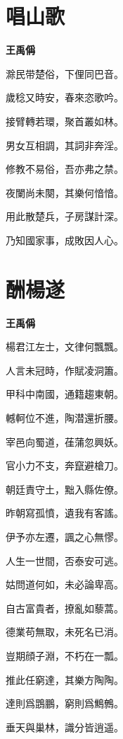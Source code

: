 \documentclass[12pt,a4paper]{ctexbook}
\begin{document}
\section{唱山歌}
\textbf{王禹偁}\par\vspace{0.5em}
滁民带楚俗，下俚同巴音。\par
歲稔又時安，春來恣歌吟。\par
接臂轉若環，聚首叢如林。\par
男女互相調，其詞非奔淫。\par
修教不易俗，吾亦弗之禁。\par
夜闌尚未闋，其樂何愔愔。\par
用此散楚兵，子房謀計深。\par
乃知國家事，成敗因人心。\par

\section{酬楊遂}
\textbf{王禹偁}\par\vspace{0.5em}
楊君江左士，文律何飄飄。\par
人言未冠時，作賦凌洞簫。\par
甲科中南國，通籍趨東朝。\par
轗軻位不進，陶潜還折腰。\par
宰邑向蜀道，龿蒲忽興妖。\par
官小力不支，奔竄避槍刀。\par
朝廷責守土，黜入縣佐僚。\par
昨朝寫孤憤，遺我有客謠。\par
伊予亦左遷，諷之心無憀。\par
人生一世間，否泰安可逃。\par
姑問道何如，未必論卑高。\par
自古富貴者，撩亂如藜蒿。\par
德業苟無取，未死名已消。\par
豈期顔子淵，不朽在一瓢。\par
推此任窮達，其樂方陶陶。\par
達則爲鵾鵬，窮則爲鷦鷯。\par
垂天與巢林，識分皆逍遥。\par
\end{document}
